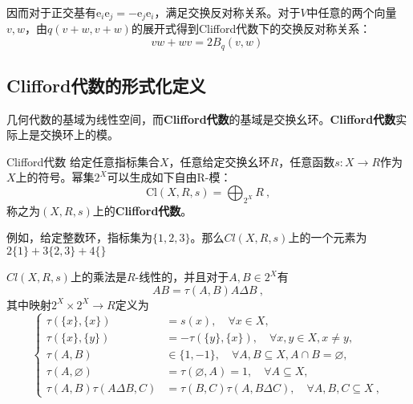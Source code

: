 因而对于正交基有$\mathrm{e}_i\mathrm{e}_j=-\mathrm{e}_j\mathrm{e}_i$，满足交换反对称关系。对于$V$中任意的两个向量$v,w$，由$q(v+w,v+w)$的展开式得到Clifford代数下的交换反对称关系：
\begin{equation}
vw+wv=2B_q(v,w)~
\end{equation}

\subsection{Clifford代数的形式化定义}
几何代数的基域为线性空间，而\textbf{Clifford代数}的基域是交换幺环。\textbf{Clifford代数}实际上是交换环上的模。
\begin{definition}{Clifford代数}
给定任意指标集合$X$，任意给定交换幺环$R$，任意函数$s:X\rightarrow {R}$作为$X$上的符号。幂集$2^X$可以生成如下自由R-模：
\begin{equation}
\mathrm{Cl}(X,R,s)=\bigoplus_{2^X}R~,
\end{equation}
称之为$(X,R,s)$上的\textbf{Clifford代数}。
\end{definition}

例如，给定整数环，指标集为$\{1,2,3\}$。那么$Cl(X,R,s)$上的一个元素为$2\{1\}+3\{2,3\}+4\{\}$


$Cl(X,R,s)$上的乘法是$R$-线性的，并且对于$A,B\in 2^X$有
\begin{equation}\label{eq_clf01_1}
AB=\tau(A,B)A\Delta B~,
\end{equation}
其中映射$2^X \times 2^X \rightarrow R$定义为
\begin{equation}
\left\{\begin{aligned}
\tau(\{x\},\{x\}) & =s(x), \quad \forall x \in X, \\
\tau(\{x\},\{y\}) & =-\tau(\{y\},\{x\}), \quad \forall x, y \in X, x \neq y, \\
\tau(A, B) & \in\{1,-1\}, \quad \forall A, B \subseteq X, A \cap B=\varnothing, \\
\tau(A, \varnothing) & =\tau(\varnothing, A)=1, \quad \forall A \subseteq X, \\
\tau(A, B) \tau(A \Delta B, C) & =\tau(B, C) \tau(A, B \Delta C), \quad \forall A, B, C \subseteq X~,
\end{aligned}\right.
\end{equation}


